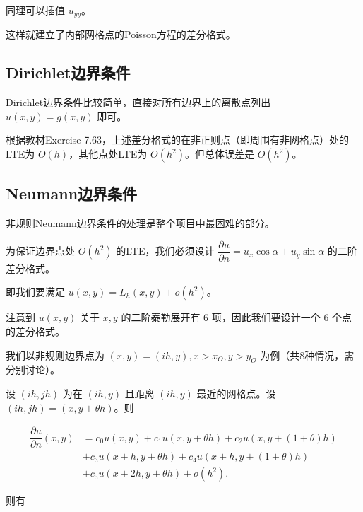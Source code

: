 \documentclass{ctexart}
\begin{document}
同理可以插值 $u_{yy}$。

这样就建立了内部网格点的Poisson方程的差分格式。

\subsection{Dirichlet边界条件}

Dirichlet边界条件比较简单，直接对所有边界上的离散点列出 $u(x,y)=g(x,y)$ 即可。

根据教材Exercise 7.63，上述差分格式的在非正则点（即周围有非网格点）处的LTE为 $O(h)$，其他点处LTE为 $O(h^2)$。但总体误差是 $O(h^2)$。

\subsection{Neumann边界条件}

非规则Neumann边界条件的处理是整个项目中最困难的部分。

为保证边界点处 $O(h^2)$ 的LTE，我们必须设计 $\dfrac {\partial u}{\partial n} = u_x\cos\alpha + u_y\sin\alpha$ 的二阶差分格式。

即我们要满足 $u(x,y) = L_h(x,y) + o(h^2)$。

注意到 $u(x,y)$ 关于 $x,y$ 的二阶泰勒展开有 $6$ 项，因此我们要设计一个 $6$ 个点的差分格式。

我们以非规则边界点为 $(x,y)=(ih,y),x>x_O,y>y_O$ 为例（共8种情况，需分别讨论）。

设 $(ih,jh)$ 为在 $(ih,y)$ 且距离 $(ih,y)$ 最近的网格点。设 $(ih,jh) = (x,y+\theta h)$。则

\begin{equation}
\begin{split}
    \dfrac{\partial u}{\partial n}(x,y) &= c_0u(x,y) + c_1u(x,y+\theta h) + c_2u(x,y+(1+\theta)h) \\ &+ c_3u(x+h,y+\theta h) + c_4u(x+h,y+(1+\theta)h)\\ &+ c_5u(x+2h,y+\theta h) + o(h^2).
\end{split}
\end{equation}

则有
\end{document}
